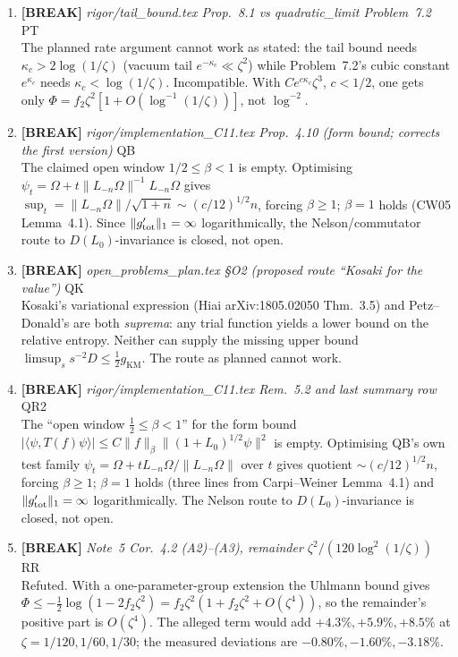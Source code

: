 \documentclass[11pt]{article}
\begin{document}
\begin{enumerate}[leftmargin=1.6em,itemsep=6pt]
\item \textbf{[BREAK]} \emph{rigor/tail\_bound.tex Prop.~8.1 vs quadratic\_limit Problem~7.2} \hfill\textsc{PT}\\ The planned rate argument cannot work as stated: the tail bound needs \(\kappa_c>2\log(1/\zeta)\) (vacuum tail \(e^{-\kappa_c}\ll\zeta^2\)) while Problem~7.2's cubic constant \(e^{\kappa_c}\) needs \(\kappa_c<\log(1/\zeta)\). Incompatible. With \(Ce^{c\kappa_c}\zeta^3\), \(c<1/2\), one gets only \(\Phi=f_2\zeta^2[1+O(\log^{-1}(1/\zeta))]\), not \(\log^{-2}\).
\item \textbf{[BREAK]} \emph{rigor/implementation\_C11.tex Prop.~4.10 (form bound; corrects the first version)} \hfill\textsc{QB}\\ The claimed open window \(1/2\le\beta<1\) is empty. Optimising \(\psi_t=\Omega+t\lVert L_{-n}\Omega\rVert^{-1}L_{-n}\Omega\) gives \(\sup_t=\lVert L_{-n}\Omega\rVert/\sqrt{1+n}\sim(c/12)^{1/2}n\), forcing \(\beta\ge1\); \(\beta=1\) holds (CW05 Lemma~4.1). Since \(\lVert g_{\rm tot}'\rVert_1=\infty\) logarithmically, the Nelson/commutator route to \(D(L_0)\)-invariance is closed, not open.
\item \textbf{[BREAK]} \emph{open\_problems\_plan.tex \S O2 (proposed route ``Kosaki for the value'')} \hfill\textsc{QK}\\ Kosaki's variational expression (Hiai arXiv:1805.02050 Thm.~3.5) and Petz--Donald's are both \emph{suprema}: any trial function yields a lower bound on the relative entropy. Neither can supply the missing upper bound \(\limsup_s s^{-2}D\le\frac12 g_{\mathrm{KM}}\). The route as planned cannot work.
\item \textbf{[BREAK]} \emph{rigor/implementation\_C11.tex Rem.~5.2 and last summary row} \hfill\textsc{QR2}\\ The ``open window \(\tfrac12\le\beta<1\)'' for the form bound \(\lvert\langle\psi,T(f)\psi\rangle\rvert\le C\lVert f\rVert_\beta\lVert(1+L_0)^{1/2}\psi\rVert^2\) is empty. Optimising QB's own test family \(\psi_t=\Omega+tL_{-n}\Omega/\lVert L_{-n}\Omega\rVert\) over \(t\) gives quotient \(\sim(c/12)^{1/2}n\), forcing \(\beta\ge1\); \(\beta=1\) holds (three lines from Carpi--Weiner Lemma~4.1) and \(\lVert g_{\rm tot}'\rVert_1=\infty\) logarithmically. The Nelson route to \(D(L_0)\)-invariance is closed, not open.
\item \textbf{[BREAK]} \emph{Note~5 Cor.~4.2 (A2)--(A3), remainder \(\zeta^2/(120\log^2(1/\zeta))\)} \hfill\textsc{RR}\\ Refuted. With a one-parameter-group extension the Uhlmann bound gives \(\Phi\le-\tfrac12\log(1-2f_2\zeta^2)=f_2\zeta^2(1+f_2\zeta^2+O(\zeta^4))\), so the remainder's positive part is \(O(\zeta^4)\). The alleged term would add \(+4.3\%,+5.9\%,+8.5\%\) at \(\zeta=1/120,1/60,1/30\); the measured deviations are \(-0.80\%,-1.60\%,-3.18\%\).

\end{enumerate}
\end{document}
